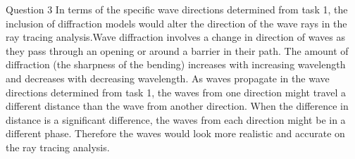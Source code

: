 
Question 3
In terms of the specific wave directions determined from task 1, the inclusion of diffraction models would alter the direction of the wave rays in the ray tracing analysis.Wave diffraction involves a change in direction of waves as they pass through an opening or around a barrier in their path. The amount of diffraction (the sharpness of the bending) increases with increasing wavelength and decreases with decreasing wavelength. As waves propagate in the wave directions determined from task 1, the waves from one direction might travel a different distance than the wave from another direction. When the difference in distance is a significant difference, the waves from each direction might be in a different phase. Therefore the waves would look more realistic and accurate on the ray tracing analysis.

